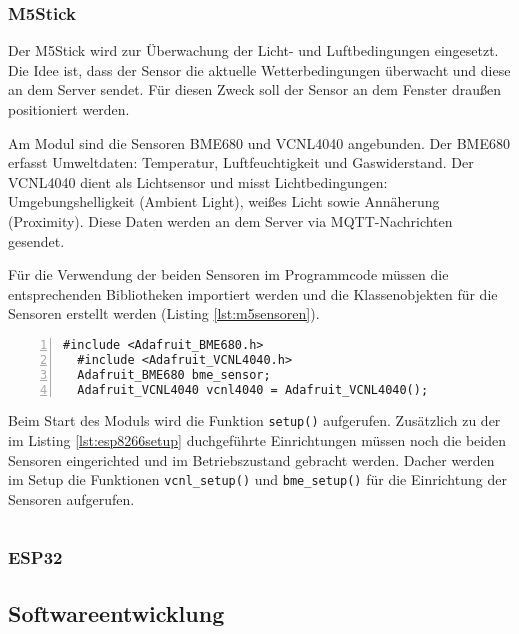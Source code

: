 \documentclass[12pt, letterpaper]{article}
\begin{document}
  \subsubsection{M5Stick}
  \par Der M5Stick wird zur Überwachung der Licht- und Luftbedingungen eingesetzt. Die Idee ist, dass der Sensor die aktuelle Wetterbedingungen überwacht und diese an dem Server sendet. Für diesen Zweck soll der Sensor an dem Fenster draußen positioniert werden.
  \par Am Modul sind die Sensoren BME680 und VCNL4040 angebunden. Der BME680 erfasst Umweltdaten: Temperatur, Luftfeuchtigkeit und Gaswiderstand. Der VCNL4040 dient als Lichtsensor und misst Lichtbedingungen: Umgebungshelligkeit (Ambient Light), weißes Licht sowie Annäherung (Proximity). Diese Daten werden an dem Server via MQTT-Nachrichten gesendet.
  \par Für die Verwendung der beiden Sensoren im Programmcode müssen die entsprechenden Bibliotheken importiert werden und die Klassenobjekten für die Sensoren erstellt werden (Listing \ref{lst:m5sensoren}). 
\begin{lstlisting}[frame=single, style=cpp, numbers=left, label={lst:m5sensoren}, caption={M5Stick: Sensoren}]
  #include <Adafruit_BME680.h>
  #include <Adafruit_VCNL4040.h>
  Adafruit_BME680 bme_sensor;
  Adafruit_VCNL4040 vcnl4040 = Adafruit_VCNL4040();
\end{lstlisting}

\par Beim Start des Moduls wird die Funktion \texttt{setup()} aufgerufen. Zusätzlich zu der im Listing \ref{lst:esp8266setup} duchgeführte Einrichtungen müssen noch die beiden Sensoren eingerichted und im Betriebszustand gebracht werden. Dacher werden im Setup die Funktionen \texttt{vcnl\_setup()} und \texttt{bme\_setup()} für die Einrichtung der Sensoren aufgerufen.

\begin{lstlisting}[frame=single, style=cpp, numbers=left, label={lst:m5vcnlsetup}, caption={M5Stick: vcnl\_setup}]

\end{lstlisting}

\subsubsection{ESP32}

\subsection{Softwareentwicklung}
\par 
\end{document}
